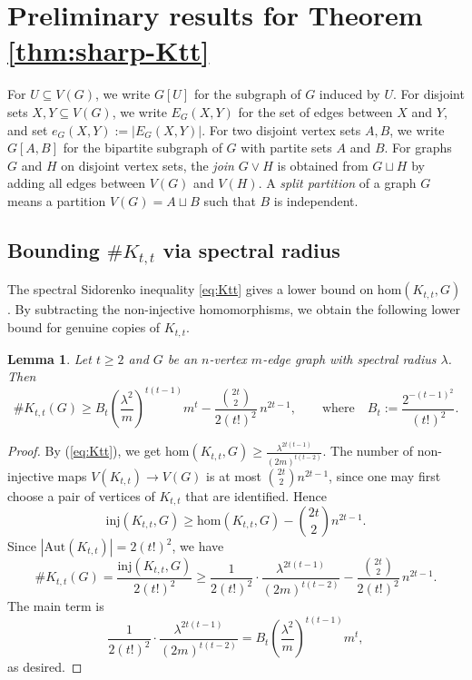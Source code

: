 \documentclass[11pt]{article}
\newtheorem{lemma}[theorem]{Lemma}
\theoremstyle{definition}
\theoremstyle{plain}
\newcommand{\Ktt}{K_{t,t}}
\newcommand{\inj}{\mathrm{inj}}
\newcommand{\homc}{\mathrm{hom}}
\newcommand{\Aut}{\mathrm{Aut}}
\begin{document}
\section{Preliminary results for Theorem \ref{thm:sharp-Ktt}}

\label{sec:preliminaries}

For \(U\subseteq V(G)\), we write \(G[U]\) for the subgraph of \(G\)
induced by \(U\).  For disjoint sets \(X,Y\subseteq V(G)\), we write
\(E_G(X,Y)\) for the set of edges between \(X\) and \(Y\), and set
\(e_G(X,Y):=|E_G(X,Y)|\).  For two disjoint vertex sets \(A,B\), we
write \(G[A,B]\) for the bipartite subgraph of \(G\) with partite sets
\(A\) and \(B\).  For graphs \(G\) and \(H\) on disjoint vertex sets,
the \emph{join} \(G\vee H\) is obtained from \(G\sqcup H\) by adding
all edges between \(V(G)\) and \(V(H)\).  A \emph{split partition} of a
graph \(G\) means a partition \(V(G)=A\sqcup B\) such that \(B\) is
independent.


\subsection{Bounding \(\texttt{\#}K_{t,t}\) via spectral radius}
The spectral Sidorenko inequality \eqref{eq:Ktt} gives a lower bound on
\(\homc(K_{t,t},G)\).  By subtracting the non-injective homomorphisms,
we obtain the following lower bound for genuine copies of \(K_{t,t}\).

\begin{lemma}
\label{lem:spectral-count-Ktt}
Let \(t\ge 2\) and \(G\) be an \(n\)-vertex $m$-edge graph with spectral
radius \(\lambda\). Then        
\[
  \texttt{\#}\Ktt(G)
  \ge
  B_t\left(\frac{\lambda^2}{m}\right)^{t(t-1)}m^t
  -
  \frac{\binom{2t}{2}}{2(t!)^2}\,n^{2t-1}, \qquad\text{where}\quad B_t:=\frac{2^{-(t-1)^2}}{(t!)^2}. 
\]
\end{lemma}

\begin{proof}
By (\ref{eq:Ktt}), we get $\homc(\Ktt,G)
  \ge
  \frac{\lambda^{2t(t-1)}}{(2m)^{t(t-2)}}$. The number of non-injective maps \(V(\Ktt)\to V(G)\) is at most
\(\binom{2t}{2}n^{2t-1}\), since one may first choose a pair of vertices
of \(K_{t,t}\) that are identified.  Hence
\[
  \inj(\Ktt,G)
  \ge
  \homc(\Ktt,G)-\binom{2t}{2}n^{2t-1}.
\]
Since \(|\Aut(\Ktt)|=2(t!)^2\), we have
\[
  \texttt{\#}\Ktt(G)
  =
  \frac{\inj(\Ktt,G)}{2(t!)^2}
  \ge
  \frac{1}{2(t!)^2}
  \cdot
  \frac{\lambda^{2t(t-1)}}{(2m)^{t(t-2)}}
  -
  \frac{\binom{2t}{2}}{2(t!)^2}\,n^{2t-1}.
\]
The main term is
\[
  \frac{1}{2(t!)^2}
  \cdot
  \frac{\lambda^{2t(t-1)}}{(2m)^{t(t-2)}}
  =
  B_t\left(\frac{\lambda^2}{m}\right)^{t(t-1)}m^t,
\]
as desired.
\end{proof}
\end{document}
